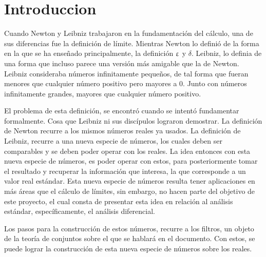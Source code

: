 \section{Introduccion}

Cuando Newton y Leibniz trabajaron en la fundamentación del cálculo, una
de sus diferencias fue la definición de límite. Mientras Newton lo
definió de la forma en la que se ha enseñado principalmente, la
definición $\upvarepsilon$ y $\delta$. Leibniz, lo definia de una forma que
incluso parece una versión más amigable que la de Newton. Leibniz
consideraba números infinitamente pequeños, de tal forma que fueran
menores que cualquier número positivo pero mayores a $0$. Junto con
números infinitamente grandes, mayores que cualquier número positivo.

El problema de esta definición, se encontró cuando se intentó fundamentar
formalmente. Cosa que Leibniz ni sus discípulos lograron demostrar.
La definición de Newton recurre a los mismos números reales ya usados.
La definición de Leibniz, recurre a una nueva especie de números, los cuales
deben ser comparables y se deben poder operar con los reales. La idea entonces
con esta nueva especie de números, es poder operar con estos, para
posteriormente tomar el resultado y recuperar la información que interesa,
la que corresponde a un valor real estándar. Esta nueva especie de números
resulta tener aplicaciones en más áreas que el cálculo de límites, sin
embargo, no hacen parte del objetivo de este proyecto, el cual consta de
presentar esta idea en relación al análisis estándar, específicamente,
el análisis diferencial.

Los pasos para la construcción de estos números, recurre a los filtros,
un objeto de la teoría de conjuntos sobre el que se hablará en el
documento. Con estos, se puede lograr la construcción de esta nueva especie
de números sobre los reales. 
